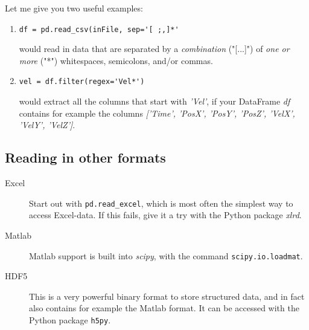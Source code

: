 Let me give you two useful examples:

\begin{enumerate}
  \item \lstinline{df = pd.read_csv(inFile, sep='[ ;,]*'}

  would read in data that are separated by a \emph{combination} ("[...]") of \emph{one or more} ("*") whitespaces, semicolons, and/or commas.

  \item \lstinline{vel = df.filter(regex='Vel*')}

  would extract all the columns that start with \emph{'Vel'}, if your DataFrame \emph{df} contains for example the columns \emph{['Time', 'PosX', 'PosY', 'PosZ', 'VelX', 'VelY', 'VelZ']}.
\end{enumerate}


\subsection{Reading in other formats}

\begin{description}
  \item[Excel] Start out with \lstinline{pd.read_excel}, which is most often the simplest way to access Excel-data. If this fails, give it a try with the Python package \emph{xlrd}.
  \item[Matlab] Matlab support is built into \emph{scipy}, with the command \lstinline{scipy.io.loadmat}.
  \item[HDF5] This is a very powerful binary format to store structured data, and in fact also contains for example the Matlab format. It can be accessed with the Python package \lstinline{h5py}.
\end{description}
